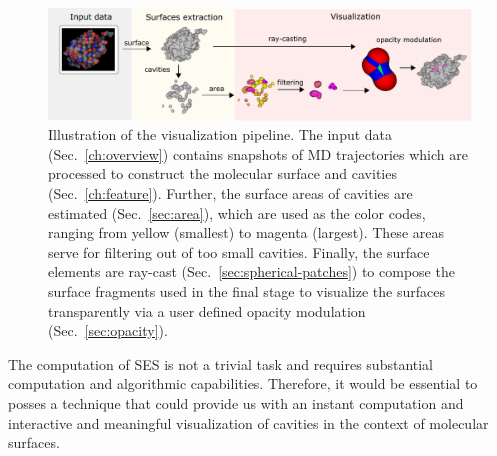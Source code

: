 \begin{figure}[tb]
  \centering
  \includegraphics[width=\textwidth]{image/overview_final.pdf}
  \caption{Illustration of the visualization pipeline. The input data (Sec.~\ref{ch:overview}) contains snapshots of MD trajectories which are processed to construct the molecular surface and cavities (Sec.~\ref{ch:feature}). Further, the surface areas of cavities are estimated (Sec.~\ref{sec:area}), which are used as the color codes, ranging from yellow (smallest) to magenta (largest). These areas serve for filtering out of too small cavities. Finally, the surface elements are ray-cast (Sec.~\ref{sec:spherical-patches}) to compose the surface fragments used in the final stage to visualize the surfaces transparently via a user defined opacity modulation (Sec.~\ref{sec:opacity}).}
	\label{fig:overview}
\end{figure}

The computation of SES is not a trivial task and requires substantial computation and algorithmic capabilities. 
Therefore, it would be essential to posses a technique that could provide us with an instant computation and interactive and meaningful visualization of cavities in the context of molecular surfaces.


